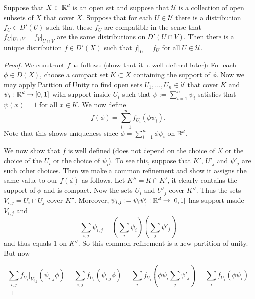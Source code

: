 \documentclass[twoside, a4paper, 10pt]{amsart}
\begin{document}
\begin{thm} Suppose that $X \subset \mathbb{R}^d$ is an open set and suppose that $\mathcal{U}$ is a collection of open subsets of $X$ that cover $X$. Suppose that for each $U \in \mathcal{U}$ there is a distribution $f_U \in D'(U)$ such that these $f_U$ are compatible in the sense that $f_U|_{U \cap V} = f_V|_{U \cap V}$ are the same distributions on $D'(U \cap V)$. Then there is a unique distribution $f \in D'(X)$ such that $f|_U = f_U$ for all $U \in \mathcal{U}$.

\end{thm}

\begin{proof} We construct $f$ as follows (show that it is well defined later): For each $\phi \in D(X)$, choose a compact set $K \subset X$ containing the support of $\phi$. Now we may apply Parition of Unity to find open sets $U_1, \ldots, U_n \in \mathcal{U}$ that cover $K$ and $\psi_i:\mathbb{R}^d \to [0,1]$ with support inside $U_i$ such that $\psi := \sum_{i=1}^n \psi_i$ satisfies that $\psi(x) = 1$ for all $x \in K$. We now define $$f(\phi) = \sum_{i=1}^n f_{U_i}(\phi \psi_i).$$ Note that this shows uniqueness since $\phi = \sum_{i=1}^n \phi \psi_i$ on $\mathbb{R}^d$.

We now show that $f$ is well defined (does not depend on the choice of $K$ or the choice of the $U_i$ or the choice of $\psi_i$). To see this, suppose that $K'$, $U'_j$ and $\psi'_j$ are such other choices. Then we make a common refinement and show it assigns the same value to our $f(\phi)$ as follows. Let $K'' = K \cap K'$, it clearly contains the support of $\phi$ and is compact. Now the sets $U_i$ and $U'_j$ cover $K''$. Thus the sets $V_{i,j} = U_i \cap U_j$ cover $K''$. Moreover, $\psi_{i,j}:=\psi_i \psi'_j:\mathbb{R}^d \to [0,1]$ has support inside $V_{i,j}$ and $$\sum_{i,j} \psi_{i,j} = \left(\sum_i \psi_i \right) \left( \sum_j \psi'_j \right)$$ and thus equals $1$ on $K''$. So this common refinement is a new partition of unity. But now 

$$\sum_{i,j} f_{U_i}|_{V_{i,j}}(\psi_{i,j}\phi) = \sum_{i,j} f_{U_i}(\psi_{i,j}\phi)  = \sum_i f_{U_i}(\phi\psi_{i}\sum_j \psi'_j) = \sum_i f_{U_i}(\phi \psi_i) $$ 


\end{proof}
\end{document}
